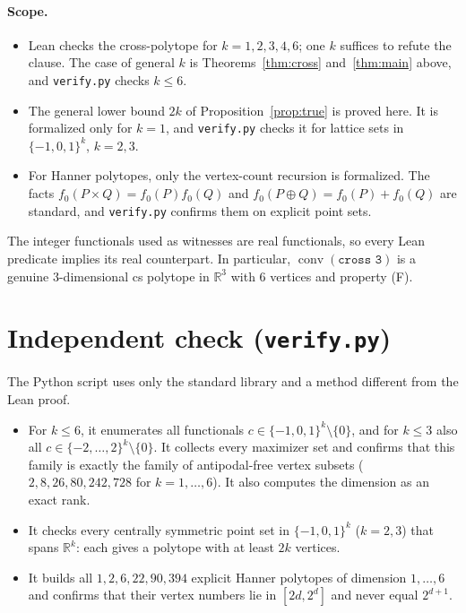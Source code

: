 \documentclass[11pt]{article}
\theoremstyle{definition}
\theoremstyle{remark}
\begin{document}
\paragraph{Scope.}
\begin{itemize}
\item Lean checks the cross-polytope for $k=1,2,3,4,6$; one $k$ suffices to refute the clause.
The case of general $k$ is Theorems~\ref{thm:cross} and~\ref{thm:main} above, and
\texttt{verify.py} checks $k\le6$.
\item The general lower bound $2k$ of Proposition~\ref{prop:true} is proved here. It is
formalized only for $k=1$, and \texttt{verify.py} checks it for lattice sets in $\{-1,0,1\}^k$, $k=2,3$.
\item For Hanner polytopes, only the vertex-count recursion is formalized. The facts
$f_0(P\times Q)=f_0(P)f_0(Q)$ and $f_0(P\oplus Q)=f_0(P)+f_0(Q)$ are standard, and
\texttt{verify.py} confirms them on explicit point sets.
\end{itemize}
The integer functionals used as witnesses are real functionals, so every Lean predicate
implies its real counterpart. In particular, $\operatorname{conv}(\texttt{cross 3})$ is a
genuine $3$-dimensional cs polytope in $\mathbb R^3$ with $6$ vertices and property (F).

\section{Independent check (\texttt{verify.py})}
The Python script uses only the standard library and a method different from the Lean proof.
\begin{itemize}
\item For $k\le6$, it enumerates all functionals $c\in\{-1,0,1\}^k\setminus\{0\}$, and for
$k\le3$ also all $c\in\{-2,\dots,2\}^k\setminus\{0\}$. It collects every maximizer set and
confirms that this family is exactly the family of antipodal-free vertex subsets ($2,8,26,80,242,728$
for $k=1,\dots,6$). It also computes the dimension as an exact rank.
\item It checks every centrally symmetric point set in $\{-1,0,1\}^k$ ($k=2,3$) that
spans $\mathbb R^k$: each gives a polytope with at least $2k$ vertices.
\item It builds all $1,2,6,22,90,394$ explicit Hanner polytopes of dimension $1,\dots,6$
and confirms that their vertex numbers lie in $[2d,2^d]$ and never equal $2^{d+1}$.
\end{itemize}
\end{document}
